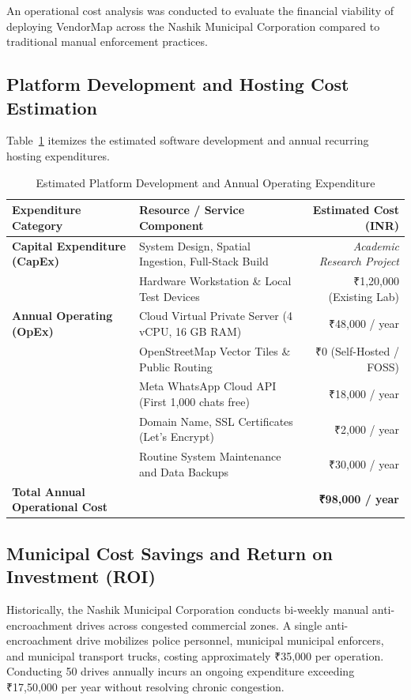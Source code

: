 An operational cost analysis was conducted to evaluate the financial viability of deploying VendorMap across the Nashik Municipal Corporation compared to traditional manual enforcement practices.

\subsection{Platform Development and Hosting Cost Estimation}
Table~\ref{tab:cost_breakdown} itemizes the estimated software development and annual recurring hosting expenditures.

\begin{table}[htbp]
\caption{Estimated Platform Development and Annual Operating Expenditure}
\label{tab:cost_breakdown}
\centering
\small
\begin{tabular}{llr}
\toprule
\textbf{Expenditure Category} & \textbf{Resource / Service Component} & \textbf{Estimated Cost (INR)} \\
\midrule
\textbf{Capital Expenditure (CapEx)} & System Design, Spatial Ingestion, Full-Stack Build & \textit{Academic Research Project} \\
                                     & Hardware Workstation \& Local Test Devices & ₹1,20,000 (Existing Lab) \\
\midrule
\textbf{Annual Operating (OpEx)}    & Cloud Virtual Private Server (4 vCPU, 16 GB RAM) & ₹48,000 / year \\
                                     & OpenStreetMap Vector Tiles \& Public Routing & ₹0 (Self-Hosted / FOSS) \\
                                     & Meta WhatsApp Cloud API (First 1,000 chats free) & ₹18,000 / year \\
                                     & Domain Name, SSL Certificates (Let's Encrypt) & ₹2,000 / year \\
                                     & Routine System Maintenance and Data Backups & ₹30,000 / year \\
\midrule
\textbf{Total Annual Operational Cost} & & \textbf{₹98,000 / year} \\
\bottomrule
\end{tabular}
\end{table}

\subsection{Municipal Cost Savings and Return on Investment (ROI)}
Historically, the Nashik Municipal Corporation conducts bi-weekly manual anti-encroachment drives across congested commercial zones. A single anti-encroachment drive mobilizes police personnel, municipal municipal enforcers, and municipal transport trucks, costing approximately ₹35,000 per operation. Conducting 50 drives annually incurs an ongoing expenditure exceeding ₹17,50,000 per year without resolving chronic congestion.

